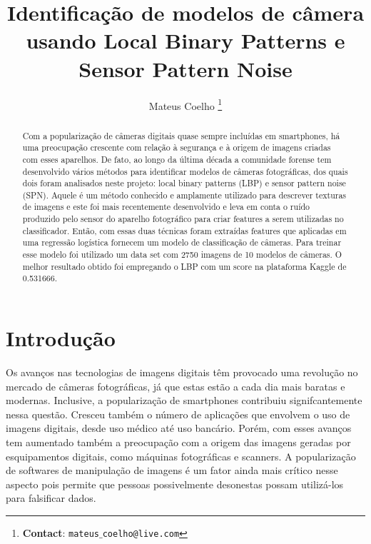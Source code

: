 \documentclass[10pt,twocolumn,letterpaper]{article}
\begin{document}
\title{Identificação de modelos de câmera usando Local Binary Patterns e Sensor Pattern Noise}
\author{Mateus Coelho \thanks{\textbf{Contact}: \tt\small{mateus$\_$coelho@live.com}}}

\maketitle
\begin{abstract}

Com a popularização de câmeras digitais quase sempre incluídas em smartphones, há uma preocupação crescente com relação à segurança e à origem de imagens criadas com esses aparelhos. De fato, ao longo da última década a comunidade forense tem desenvolvido vários métodos para identificar modelos de câmeras fotográficas, dos quais dois foram analisados neste projeto: local binary patterns (LBP) e sensor pattern noise (SPN). Aquele é um método conhecido e amplamente utilizado para descrever texturas de imagens e este foi mais recentemente desenvolvido e leva em conta o ruído produzido pelo sensor do aparelho fotográfico para criar features a serem utilizadas no classificador. Então, com essas duas técnicas foram extraídas features que aplicadas em uma regressão logística fornecem um modelo de classificação de câmeras. Para treinar esse modelo foi utilizado um data set com 2750 imagens de 10 modelos de câmeras. O melhor resultado obtido foi empregando o LBP com um score na plataforma Kaggle de 0.531666.

\end{abstract}

\section{Introdução}

Os avanços nas tecnologias de imagens digitais têm provocado uma revolução no mercado de câmeras fotográficas, já que estas estão a cada dia mais baratas e modernas. Inclusive, a popularização de smartphones contribuiu signifcantemente nessa questão. Cresceu também o número de aplicações que envolvem o uso de imagens digitais, desde uso médico até uso bancário. Porém, com esses avanços tem aumentado também a preocupação com a origem das imagens geradas por esquipamentos digitais, como máquinas fotográficas e scanners. A popularização de softwares de manipulação de imagens é um fator ainda mais crítico nesse aspecto pois permite que pessoas possivelmente desonestas possam utilizá-los para falsificar dados.
\end{document}
